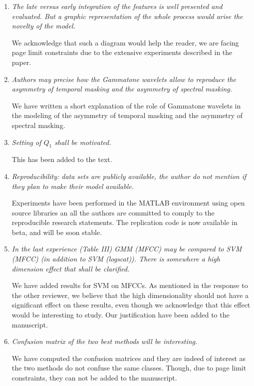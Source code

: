 \documentclass[10pt]{article}
\begin{document}
\begin{enumerate}

\item \emph{The late versus early integration of the features is well presented and evaluated. But a graphic representation of the whole process would arise the novelty of the model.}

We acknowledge that such a diagram would help the reader, we are facing page limit constraints due to the extensive experiments described in the paper.

\item \emph{Authors may precise how the Gammatone wavelets allow to reproduce the asymmetry of temporal masking and the asymmetry of spectral masking.}

We have written a short explanation of the role of Gammatone wavelets in the modeling of the asymmetry of temporal masking and the asymmetry of spectral masking.

\item \emph{Setting of $Q_1$ shall be motivated.}

This has been added to the text.

\item \emph{Reproducibility:  data sets are publicly available, the author do not mention if they plan to make their model available.}

Experiments have been performed in the MATLAB environment using open source libraries an all the authors are committed to comply to the reproducible research statements. The replication code is now available in beta, and will be soon stable.

\item \emph{In the last experience (Table III) GMM (MFCC) may be compared to SVM (MFCC) (in addition to SVM (logscat)). There is somewhere a high dimension effect that shall be clarified.}

We have added results for SVM on MFCCs. As mentioned in the response to the other reviewer, we believe that the high dimensionality should not have a significant effect on these results, even though we acknowledge that this effect would be interesting to study. Our justification have been added to the manuscript.

\item \emph{Confusion matrix of the two best methods will be interesting.}

We have computed the confusion matrices and they are indeed of interest as the two methods do not confuse the same classes. Though, due to page limit constraints, they can not be added to the manuscript.


\end{enumerate}
\end{document}
